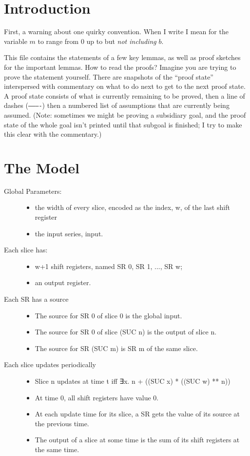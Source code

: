 \documentclass{article}
\begin{document}
\section*{Introduction}
First, a warning about one quirky convention.
When I write  I mean for the variable $m$ to range from $0$ up to but \emph{not including} $b$.

This file contains the statements of a few key lemmas, as well as proof sketches for the important lemmas.
How to read the proofs?
Imagine you are trying to prove the statement yourself.
There are snapshots of the ``proof state'' interspersed with commentary on what to do next to get to the next proof state.
A proof state consists of what is currently remaining to be proved, then a line of dashes (\texttt{----------}) then a numbered list of assumptions that are currently being assumed.
(Note: sometimes we might be proving a subsidiary goal, and the proof state of the whole goal isn't printed until that subgoal is finished; I try to make this clear with the commentary.)

\section*{The Model}
\begin{description}
\item[Global Parameters:]\hfill
\begin{itemize}
\item
     the width of every slice, encoded as the index, w, of the last shift register
\item
     the input series, input.
\end{itemize}
\item[Each slice has:]\hfill
\begin{itemize}
\item
     w+1 shift registers, named SR 0, SR 1, ..., SR w;
\item
     an output register.
\end{itemize}
\item[Each SR has a source]\hfill
\begin{itemize}
\item
     The source for SR 0 of slice 0 is the global input.
\item
     The source for SR 0 of slice (SUC n) is the output of slice n.
\item
     The source for SR (SUC m) is SR m of the same slice.
\end{itemize}
\item[Each slice updates periodically]\hfill
\begin{itemize}
\item
     Slice n updates at time t iff ∃x. n + ((SUC x) * ((SUC w) ** n))
\item
   At time 0, all shift registers have value 0.
\item
   At each update time for its slice, a SR gets the value of its source at the previous time.
\item
   The output of a slice at some time is the sum of its shift registers at the same time.
\end{itemize}
\end{description}
\end{document}
